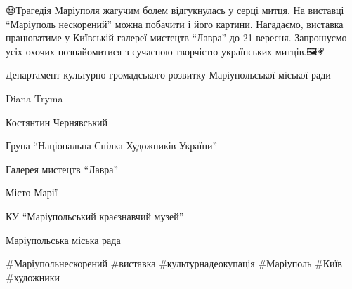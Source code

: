 😓Трагедія Маріуполя жагучим болем відгукнулась у серці митця.  На виставці
\enquote{Маріуполь нескорений} можна побачити і його картини.  Нагадаємо, виставка
працюватиме у Київській галереї мистецтв \enquote{Лавра} до 21 вересня. Запрошуємо
усіх охочих познайомитися  з сучасною творчістю українських митців.🖼💗

Департамент культурно-громадського розвитку Маріупольської міської ради \par
Diana Tryma \par
Костянтин Чернявський \par
Група \enquote{Національна Спілка Художників України} \par
Галерея мистецтв \enquote{Лавра} \par
Місто Марії \par
КУ \enquote{Маріупольський краєзнавчий музей} \par
Маріупольська міська рада \par
\#Маріупольнескорений \#виставка \#культурнадеокупація \#Маріуполь \#Київ \#художники\par
